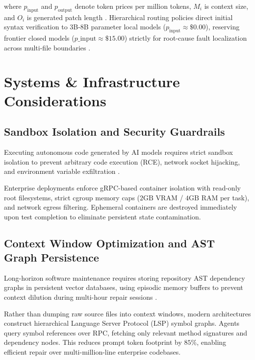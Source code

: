\documentclass[10pt,journal,compsoc,twocolumn]{IEEEtran}
\begin{document}
where $p_{\text{input}}$ and $p_{\text{output}}$ denote token prices per million tokens, $M_i$ is context size, and $O_i$ is generated patch length \cite{feuerriegel2023generativeai}. Hierarchical routing policies direct initial syntax verification to 3B-8B parameter local models ($p_{\text{input}} \approx \$0.00$), reserving frontier closed models ($p\_{\text{input}} \approx \$15.00$) strictly for root-cause fault localization across multi-file boundaries \cite{joshua2026adoptiondepth}.




\section{Systems \& Infrastructure Considerations}



\subsection{Sandbox Isolation and Security Guardrails}

Executing autonomous code generated by AI models requires strict sandbox isolation to prevent arbitrary code execution (RCE), network socket hijacking, and environment variable exfiltration \cite{openalex_w7125699492}.

Enterprise deployments enforce gRPC-based container isolation with read-only root filesystems, strict cgroup memory caps ($2\text{GB}$ VRAM / $4\text{GB}$ RAM per task), and network egress filtering. Ephemeral containers are destroyed immediately upon test completion to eliminate persistent state contamination.


\subsection{Context Window Optimization and AST Graph Persistence}

Long-horizon software maintenance requires storing repository AST dependency graphs in persistent vector databases, using episodic memory buffers to prevent context dilution during multi-hour repair sessions \cite{feuerriegel2023generativeai}.

Rather than dumping raw source files into context windows, modern architectures construct hierarchical Language Server Protocol (LSP) symbol graphs. Agents query symbol references over RPC, fetching only relevant method signatures and dependency nodes. This reduces prompt token footprint by $85\%$, enabling efficient repair over multi-million-line enterprise codebases.
\end{document}
